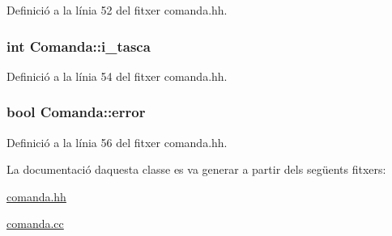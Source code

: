 Definició a la línia 52 del fitxer comanda.\+hh.

\hypertarget{class_comanda_aab152fe48a937f449c027a2274fc31e7}{}
\subsubsection[{i\+\_\+tasca}]{\setlength{\rightskip}{0pt plus 5cm}int Comanda\+::i\+\_\+tasca\hspace{0.3cm}{\ttfamily [private]}}\label{class_comanda_aab152fe48a937f449c027a2274fc31e7}


Definició a la línia 54 del fitxer comanda.\+hh.

\hypertarget{class_comanda_a9a1bf4bf74940a4bac90140e67d11972}{}
\subsubsection[{error}]{\setlength{\rightskip}{0pt plus 5cm}bool Comanda\+::error\hspace{0.3cm}{\ttfamily [private]}}\label{class_comanda_a9a1bf4bf74940a4bac90140e67d11972}


Definició a la línia 56 del fitxer comanda.\+hh.



La documentació d\textquotesingle{}aquesta classe es va generar a partir dels següents fitxers\+:\begin{DoxyCompactItemize}
\item 
\hyperlink{comanda_8hh}{comanda.\+hh}\item 
\hyperlink{comanda_8cc}{comanda.\+cc}\end{DoxyCompactItemize}
